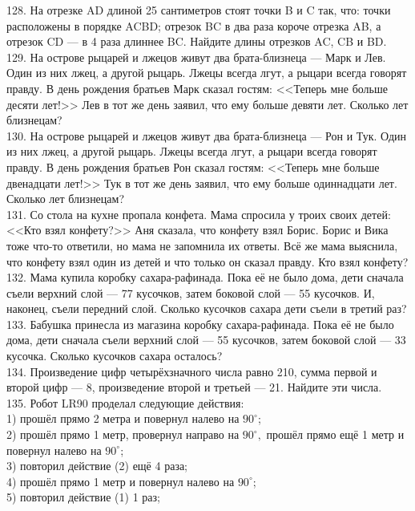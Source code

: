 128. На отрезке AD длиной 25 сантиметров стоят точки B и C так, что: точки расположены в порядке ACBD; отрезок BC в два раза короче отрезка AB, а отрезок CD --- в 4 раза длиннее BC. Найдите длины отрезков AC, CB и BD.\\
129. На острове рыцарей и лжецов живут два брата-близнеца --- Марк и Лев. Один из них лжец, а другой рыцарь. Лжецы всегда лгут, а рыцари всегда говорят правду. В день рождения братьев Марк сказал гостям: <<Теперь мне больше десяти лет!>> Лев в тот же день заявил, что ему больше девяти лет. Сколько лет близнецам?\\
130. На острове рыцарей и лжецов живут два брата-близнеца --- Рон и Тук. Один из них лжец, а другой рыцарь. Лжецы всегда лгут, а рыцари всегда говорят правду. В день рождения братьев Рон сказал гостям: <<Теперь мне больше двенадцати лет!>> Тук в тот же день заявил, что ему больше одиннадцати лет. Сколько лет близнецам?\\
131. Со стола на кухне пропала конфета. Мама спросила у троих своих детей: <<Кто взял конфету?>> Аня сказала, что конфету взял Борис. Борис и Вика тоже что-то ответили, но мама не запомнила их ответы. Всё же мама выяснила, что конфету взял один из детей и что только он сказал правду. Кто взял конфету?\\
132. Мама купила коробку сахара-рафинада. Пока её не было дома, дети сначала съели верхний слой --- 77 кусочков, затем боковой слой --- 55 кусочков. И, наконец, съели передний слой. Сколько кусочков сахара дети съели в третий раз?\\
133. Бабушка принесла из магазина коробку сахара-рафинада. Пока её не было дома, дети сначала съели верхний слой --- 55 кусочков, затем боковой слой --- 33 кусочка. Сколько кусочков сахара осталось?\\
134. Произведение цифр четырёхзначного числа равно 210, сумма первой и второй цифр --- 8, произведение второй и третьей --- 21. Найдите эти числа.\\
135. Робот LR90 проделал следующие действия:\\
1) прошёл прямо 2 метра и повернул налево на $90^\circ$;\\
2) прошёл прямо 1 метр, провернул направо на $90^\circ,$ прошёл прямо ещё 1 метр и повернул налево на $90^\circ$;\\
3) повторил действие (2) ещё 4 раза;\\
4) прошёл прямо 1 метр и повернул налево на $90^\circ$;\\
5) повторил действие (1) 1 раз;\\
